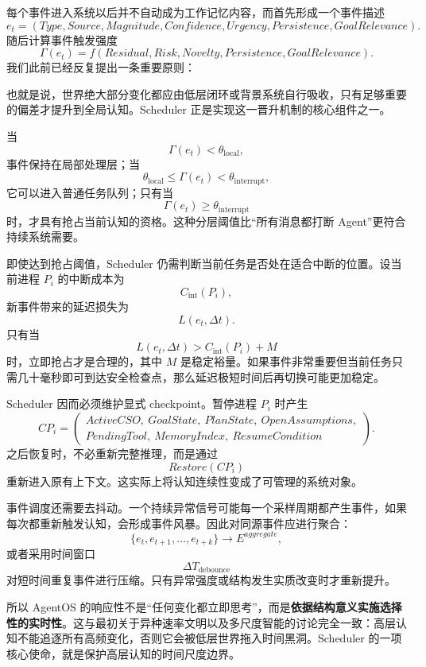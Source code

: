 每个事件进入系统以后并不自动成为工作记忆内容，而首先形成一个事件描述
\[
e_t=
(
Type,
Source,
Magnitude,
Confidence,
Urgency,
Persistence,
GoalRelevance
).
\]
随后计算事件触发强度
\[
\Gamma(e_t)
=
f(
Residual,
Risk,
Novelty,
Persistence,
GoalRelevance
).
\]
我们此前已经反复提出一条重要原则：
\begin{statementbox}
\centering
{}
\end{statementbox}
也就是说，世界绝大部分变化都应由低层闭环或背景系统自行吸收，只有足够重要的偏差才提升到全局认知。Scheduler 正是实现这一晋升机制的核心组件之一。

当
\[
\Gamma(e_t)<\theta_{\mathrm{local}},
\]
事件保持在局部处理层；当
\[
\theta_{\mathrm{local}}
\leq
\Gamma(e_t)
<
\theta_{\mathrm{interrupt}},
\]
它可以进入普通任务队列；只有当
\[
\Gamma(e_t)\geq\theta_{\mathrm{interrupt}}
\]
时，才具有抢占当前认知的资格。这种分层阈值比“所有消息都打断 Agent”更符合持续系统需要。

即使达到抢占阈值，Scheduler 仍需判断当前任务是否处在适合中断的位置。设当前进程 $P_i$ 的中断成本为
\[
C_{\mathrm{int}}(P_i),
\]
新事件带来的延迟损失为
\[
L(e_t,\Delta t).
\]
只有当
\[
L(e_t,\Delta t)
>
C_{\mathrm{int}}(P_i)+M
\]
时，立即抢占才是合理的，其中 $M$ 是稳定裕量。如果事件非常重要但当前任务只需几十毫秒即可到达安全检查点，那么延迟极短时间后再切换可能更加稳定。

Scheduler 因而必须维护显式 checkpoint。暂停进程 $P_i$ 时产生
\[
CP_i=
\left(
\begin{gathered}
ActiveCSO,\ GoalState,\ PlanState,\ OpenAssumptions,\\
PendingTool,\ MemoryIndex,\ ResumeCondition
\end{gathered}
\right).
\]
之后恢复时，不必重新完整推理，而是通过
\[
Restore(CP_i)
\]
重新进入原有上下文。这实际上将认知连续性变成了可管理的系统对象。

事件调度还需要去抖动。一个持续异常信号可能每一个采样周期都产生事件，如果每次都重新触发认知，会形成事件风暴。因此对同源事件应进行聚合：
\[
\{e_t,e_{t+1},\ldots,e_{t+k}\}
\rightarrow
E^{aggregate},
\]
或者采用时间窗口
\[
\Delta T_{\mathrm{debounce}}
\]
对短时间重复事件进行压缩。只有异常强度或结构发生实质改变时才重新提升。

所以 AgentOS 的响应性不是“任何变化都立即思考”，而是\textbf{依据结构意义实施选择性的实时性}。这与最初关于异种速率文明以及多尺度智能的讨论完全一致：高层认知不能追逐所有高频变化，否则它会被低层世界拖入时间黑洞。Scheduler 的一项核心使命，就是保护高层认知的时间尺度边界。

